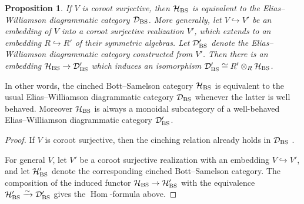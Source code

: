 \documentclass{amsart}
\theoremstyle{plain}
\newtheorem{prop}[thm]{Proposition}
\theoremstyle{definition}
\theoremstyle{remark}
\numberwithin{equation}{section}
\DeclareMathOperator{\Hom}{Hom}
\DeclareMathOperator{\Sym}{Sym}
\begin{document}
\begin{prop}
If $V$ is coroot surjective, then $\mathcal{H}_{\rm BS}$ is equivalent to the Elias--Williamson diagrammatic category $\mathcal{D}_{\rm BS}$.
More generally, let $V \hookrightarrow V'$ be an embedding of $V$ into a coroot surjective realization $V'$, which extends to an embedding $R \hookrightarrow R'$ of their symmetric algebras. 
Let $\mathcal{D}'_{\rm BS}$ denote the Elias--Williamson diagrammatic category constructed from $V'$. 
Then there is an embedding $\mathcal{H}_{\rm BS} \rightarrow \mathcal{D}'_{\rm BS}$ which induces an isomorphism $\mathcal{D}'_{\rm BS} \cong R' \otimes_R \mathcal{H}_{\rm BS}$. 
\end{prop}

In other words, the cinched Bott--Samelson category $\mathcal{H}_{\rm BS}$ is equivalent to the usual Elias--Williamson diagrammatic category $\mathcal{D}_{\rm BS}$ whenever the latter is well behaved.
Moreover $\mathcal{H}_{\rm BS}$ is always a monoidal subcategory of a well-behaved Elias--Williamson diagrammatic category $\mathcal{D}'_{\rm BS}$. 

\begin{proof}
If $V$ is coroot surjective, then the cinching relation already holds in $\mathcal{D}_{\rm BS}$ \cite[(5.14)--(5.15)]{EW-SoergelCalc}. 

For general $V$, let $V'$ be a coroot surjective realization with an embedding $V \hookrightarrow V'$, and let $\mathcal{H}'_{\rm BS}$ denote the corresponding cinched Bott--Samelson category.
The composition of the induced functor $\mathcal{H}_{\rm BS} \rightarrow \mathcal{H}'_{\rm BS}$ with the equivalence $\mathcal{H}'_{\rm BS} \xrightarrow{\sim} \mathcal{D}'_{\rm BS}$ gives the $\Hom$-formula above.
\end{proof}
\end{document}
